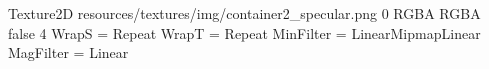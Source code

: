 Texture2D
resources/textures/img/container2_specular.png
0
RGBA
RGBA
false
4
WrapS = Repeat
WrapT = Repeat
MinFilter = LinearMipmapLinear
MagFilter = Linear
